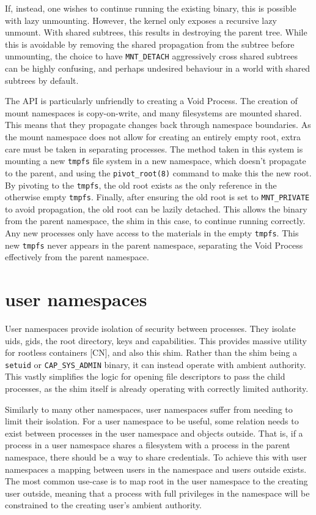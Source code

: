 \documentclass[a4paper,12pt,twoside,openright]{report}
\begin{document}
If, instead, one wishes to continue running the existing binary, this is possible with lazy unmounting. However, the kernel only exposes a recursive lazy unmount. With shared subtrees, this results in destroying the parent tree. While this is avoidable by removing the shared propagation from the subtree before unmounting, the choice to have \texttt{MNT\_DETACH} aggressively cross shared subtrees can be highly confusing, and perhaps undesired behaviour in a world with shared subtrees by default.

The API is particularly unfriendly to creating a Void Process. The creation of mount namespaces is copy-on-write, and many filesystems are mounted shared. This means that they propagate changes back through namespace boundaries. As the mount namespace does not allow for creating an entirely empty root, extra care must be taken in separating processes. The method taken in this system is mounting a new \texttt{tmpfs} file system in a new namespace, which doesn't propagate to the parent, and using the \texttt{pivot\_root(8)} command to make this the new root. By pivoting to the \texttt{tmpfs}, the old root exists as the only reference in the otherwise empty \texttt{tmpfs}. Finally, after ensuring the old root is set to \texttt{MNT\_PRIVATE} to avoid propagation, the old root can be lazily detached. This allows the binary from the parent namespace, the shim in this case, to continue running correctly. Any new processes only have access to the materials in the empty \texttt{tmpfs}. This new \texttt{tmpfs} never appears in the parent namespace, separating the Void Process effectively from the parent namespace.

\section{user namespaces}
\label{sec:voiding-user}

User namespaces provide isolation of security between processes. They isolate uids, gids, the root directory, keys and capabilities. This provides massive utility for rootless containers [CN], and also this shim. Rather than the shim being a \texttt{setuid} or \texttt{CAP\_SYS\_ADMIN} binary, it can instead operate with ambient authority. This vastly simplifies the logic for opening file descriptors to pass the child processes, as the shim itself is already operating with correctly limited authority.

Similarly to many other namespaces, user namespaces suffer from needing to limit their isolation. For a user namespace to be useful, some relation needs to exist between processes in the user namespace and objects outside. That is, if a process in a user namespace shares a filesystem with a process in the parent namespace, there should be a way to share credentials. To achieve this with user namespaces a mapping between users in the namespace and users outside exists. The most common use-case is to map root in the user namespace to the creating user outside, meaning that a process with full privileges in the namespace will be constrained to the creating user's ambient authority.
\end{document}
